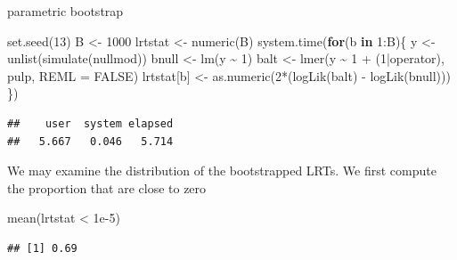 \documentclass[
  ignorenonframetext,
]{beamer}
\newenvironment{Shaded}{\begin{snugshade}}{\end{snugshade}}
\newcommand{\AttributeTok}[1]{\textcolor[rgb]{0.77,0.63,0.00}{#1}}
\newcommand{\ConstantTok}[1]{\textcolor[rgb]{0.00,0.00,0.00}{#1}}
\newcommand{\ControlFlowTok}[1]{\textcolor[rgb]{0.13,0.29,0.53}{\textbf{#1}}}
\newcommand{\DecValTok}[1]{\textcolor[rgb]{0.00,0.00,0.81}{#1}}
\newcommand{\FloatTok}[1]{\textcolor[rgb]{0.00,0.00,0.81}{#1}}
\newcommand{\FunctionTok}[1]{\textcolor[rgb]{0.00,0.00,0.00}{#1}}
\newcommand{\NormalTok}[1]{#1}
\newcommand{\OtherTok}[1]{\textcolor[rgb]{0.56,0.35,0.01}{#1}}
\newcommand{\SpecialCharTok}[1]{\textcolor[rgb]{0.00,0.00,0.00}{#1}}
\begin{document}
\begin{frame}[fragile]{parametric bootstrap}
\protect\hypertarget{parametric-bootstrap}{}
\tiny

\begin{Shaded}
\begin{Highlighting}[]
\FunctionTok{set.seed}\NormalTok{(}\DecValTok{13}\NormalTok{)}
\NormalTok{B }\OtherTok{\textless{}{-}} \DecValTok{1000}
\NormalTok{lrtstat }\OtherTok{\textless{}{-}} \FunctionTok{numeric}\NormalTok{(B)}
\FunctionTok{system.time}\NormalTok{(}\ControlFlowTok{for}\NormalTok{(b }\ControlFlowTok{in} \DecValTok{1}\SpecialCharTok{:}\NormalTok{B)\{}
\NormalTok{  y }\OtherTok{\textless{}{-}} \FunctionTok{unlist}\NormalTok{(}\FunctionTok{simulate}\NormalTok{(nullmod))}
\NormalTok{  bnull }\OtherTok{\textless{}{-}} \FunctionTok{lm}\NormalTok{(y }\SpecialCharTok{\textasciitilde{}} \DecValTok{1}\NormalTok{)}
\NormalTok{  balt }\OtherTok{\textless{}{-}} \FunctionTok{lmer}\NormalTok{(y }\SpecialCharTok{\textasciitilde{}} \DecValTok{1} \SpecialCharTok{+}\NormalTok{ (}\DecValTok{1}\SpecialCharTok{|}\NormalTok{operator), pulp, }\AttributeTok{REML =} \ConstantTok{FALSE}\NormalTok{)}
\NormalTok{  lrtstat[b] }\OtherTok{\textless{}{-}} \FunctionTok{as.numeric}\NormalTok{(}\DecValTok{2}\SpecialCharTok{*}\NormalTok{(}\FunctionTok{logLik}\NormalTok{(balt) }\SpecialCharTok{{-}} \FunctionTok{logLik}\NormalTok{(bnull)))}
\NormalTok{\})}
\end{Highlighting}
\end{Shaded}

\begin{verbatim}
##    user  system elapsed 
##   5.667   0.046   5.714
\end{verbatim}

\vspace{12pt}
\normalsize

We may examine the distribution of the bootstrapped LRTs. We first
compute the proportion that are close to zero

\vspace{12pt}
\tiny

\begin{Shaded}
\begin{Highlighting}[]
\FunctionTok{mean}\NormalTok{(lrtstat }\SpecialCharTok{\textless{}} \FloatTok{1e{-}5}\NormalTok{)}
\end{Highlighting}
\end{Shaded}

\begin{verbatim}
## [1] 0.69
\end{verbatim}
\end{frame}
\end{document}
